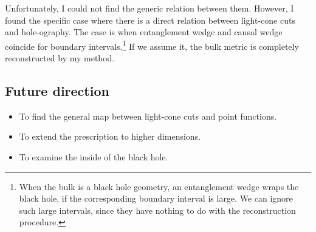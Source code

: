 \documentclass[12pt]{article}
\begin{document}
Unfortunately, I could not find the generic relation between them.
However, I found the specific case where there is a direct relation between light-cone cuts and hole-ography.
The case is when entanglement wedge and causal wedge coincide for boundary intervals.\footnote{
When the bulk is a black hole geometry,
an entanglement wedge wraps the black hole, if the corresponding boundary interval is large.
We can ignore such large intervals, since they have nothing to do with the reconstruction procedure.
}
If we assume it, the bulk metric is completely reconstructed by my method.


\subsection*{Future direction}
\begin{itemize}
	\item To find the general map between light-cone cuts and point functions.
	\item To extend the prescription to higher dimensions.
	\item To examine the inside of the black hole.
\end{itemize}



 

\end{document}
